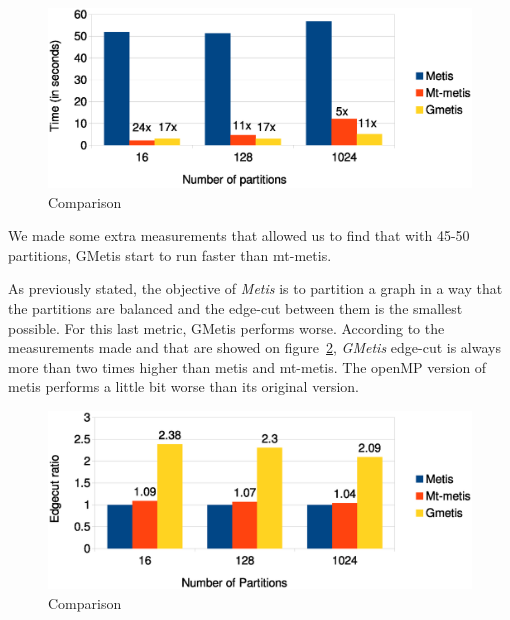 \documentclass[abstract=on,9pt,twocolumn]{scrartcl}
\begin{document}
\begin{center}
\begin{figure}[htb]
    \includegraphics[width=\columnwidth]{img/comparison3.eps}
    \caption{Comparison}
    \label{img:comparison3}
\end{figure}
\end{center}

We made some extra measurements that allowed us to find that with 45-50
partitions, GMetis start to run faster than mt-metis.


As previously stated, the objective of \textit{Metis} is to partition a
graph in a way that the partitions are balanced and the edge-cut between
them is the smallest possible. For this last metric, GMetis performs
worse. According to the measurements made and that are showed on figure~\ref{img:edgecut},
\textit{GMetis} edge-cut is always more than two times higher than metis
and mt-metis. The openMP version of metis performs a little bit worse
than its original version.

\begin{center}
\begin{figure}[htb]
    \includegraphics[width=\columnwidth]{img/edgecut.eps}
    \caption{Comparison}
    \label{img:edgecut}
\end{figure}
\end{center}
\end{document}

